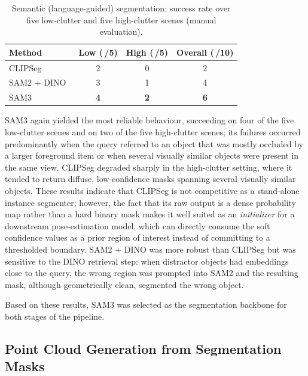 \documentclass[conference,letterpaper,10pt]{IEEEtran}
\begin{document}
\begin{table}[!t]
\caption{Semantic (language-guided) segmentation: success rate over
five low-clutter and five high-clutter scenes (manual evaluation).}
\label{tab:semantic}
\centering
\renewcommand{\arraystretch}{1.15}
\begin{tabular}{lccc}
\toprule
Method               & Low (\,/5) & High (\,/5) & Overall (\,/10) \\
\midrule
CLIPSeg~\cite{clipseg}     & 2 & 0 & 2 \\
SAM2 + DINO~\cite{sam2,dinov2} & 3 & 1 & 4 \\
SAM3~\cite{sam3}           & \textbf{4} & \textbf{2} & \textbf{6} \\
\bottomrule
\end{tabular}
\end{table}

SAM3 again yielded the most reliable behaviour, succeeding on four of
the five low-clutter scenes and on two of the five high-clutter
scenes; its failures occurred predominantly when the query referred
to an object that was mostly occluded by a larger foreground item or
when several visually similar objects were present in the same view. CLIPSeg degraded sharply
in the high-clutter setting, where it tended to return diffuse,
low-confidence masks spanning several visually similar objects. These
results indicate that CLIPSeg is not competitive as a stand-alone
instance segmenter; however, the fact that its raw output is a dense
probability map rather than a hard binary mask makes it well suited
as an \emph{initializer} for a downstream pose-estimation model, which
can directly consume the soft confidence values as a prior region of
interest instead of committing to a thresholded boundary.
SAM2 + DINO was more robust than CLIPSeg but was sensitive to the
DINO retrieval step: when distractor objects had embeddings close to
the query, the wrong region was prompted into SAM2 and the resulting
mask, although geometrically clean, segmented the wrong object.

Based on these results, SAM3 was selected as the segmentation backbone
for both stages of the pipeline.

\subsection{Point Cloud Generation from Segmentation Masks}
\label{subsec:pointcloud}
\end{document}
